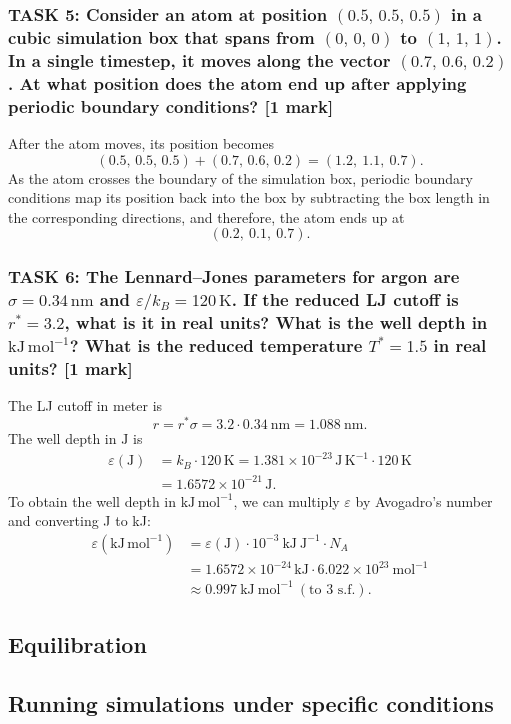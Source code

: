 \documentclass[a4paper,10pt,twocolumn]{article}
\begin{document}
\subsubsection*{TASK 5: Consider an atom at position $(0.5,\,0.5,\,0.5)$ in a cubic simulation box that spans from $(0,\,0,\,0)$ to $(1,\,1,\,1)$. In a single timestep, it moves along the vector $(0.7,\,0.6,\,0.2)$. At what position does the atom end up after applying periodic boundary conditions? [1 mark]}
After the atom moves, its position becomes
\[
(0.5,\,0.5,\,0.5)+ (0.7,\,0.6,\,0.2)=(1.2,\ 1.1,\ 0.7).
\] 
As the atom crosses the boundary of the simulation box, periodic boundary conditions map its position back into the box by subtracting the box length in the corresponding directions, and therefore, the atom ends up at
\[
(0.2,\ 0.1,\ 0.7).
\]
\subsubsection*{TASK 6: The Lennard--Jones parameters for argon are $\sigma = 0.34\,\mathrm{nm}$ and $\varepsilon/k_B = 120\,\mathrm{K}$. If the reduced LJ cutoff is $r^* = 3.2$, what is it in real units? What is the well depth in $\mathrm{kJ\,mol^{-1}}$? What is the reduced temperature $T^* = 1.5$ in real units? [1 mark]}
The LJ cutoff in meter is 
\[
r=r^*\sigma=3.2\cdot 0.34\ \mathrm{nm}=1.088\ \mathrm{nm}.
\]
The well depth in $\mathrm{J}$ is
\begin{align*}
\varepsilon(\mathrm{J}) &= k_B \cdot 120\,\mathrm{K} =1.381\times10^{-23}\,\mathrm{J\,K^{-1}}\cdot120\,\mathrm{K} 
\\
&=  1.6572\times10^{-21}\,\mathrm{J}.
\end{align*}
To obtain the well depth in $\mathrm{kJ\,mol^{-1}}$, we can multiply $\varepsilon$ by Avogadro's number and converting J to kJ:
\begin{align*}
\varepsilon(\mathrm{kJ\,mol^{-1}}) 
&= \varepsilon(\mathrm{J})\cdot10^{-3}\ \mathrm{kJ\ J^{-1}}\cdot N_A
\\
&=  1.6572\times10^{-24}\,\mathrm{kJ}\cdot 6.022\times10^{23}\ \mathrm{mol^{-1}}
\\
&\approx 0.997\ \mathrm{kJ\ mol^{-1}}\ (\text{to 3 s.f.}).
\end{align*}
\subsection{Equilibration}

\subsection{Running simulations under specific conditions}
\end{document}
